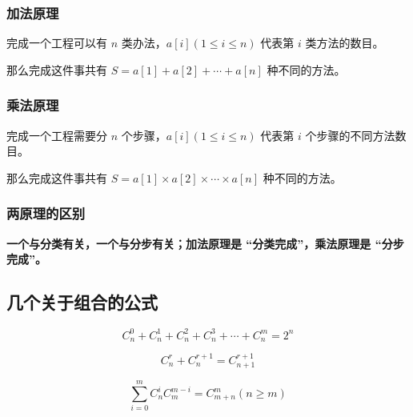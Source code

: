 \subsubsection{加法原理}

完成一个工程可以有 $n$ 类办法，$a[i](1 \le i \le n)$ 代表第 $i$ 类方法的数目。

那么完成这件事共有 $S=a[1]+a[2]+\cdots +a[n]$ 种不同的方法。

\subsubsection{乘法原理}

完成一个工程需要分 $n$ 个步骤，$a[i](1 \le i \le n)$ 代表第 $i$ 个步骤的不同方法数目。

那么完成这件事共有 $S = a[1] \times a[2] \times \cdots \times a[n]$ 种不同的方法。

\subsubsection{两原理的区别}

\textbf{ 一个与分类有关，一个与分步有关；加法原理是 “分类完成”，乘法原理是 “分步完成”。}

\subsection{几个关于组合的公式}

$$
C_n^0 + C_n^1 + C_n^2 + C_n^3 + \cdots + C_n^m = 2^n
$$

$$
C_n^r + C_n^{r+1} = C_{n+1}^{r+1}
$$

$$
\sum_{i=0}^m C_n^i C_m^{m-i} = C_{m+n}^m(n \geq m)
$$
